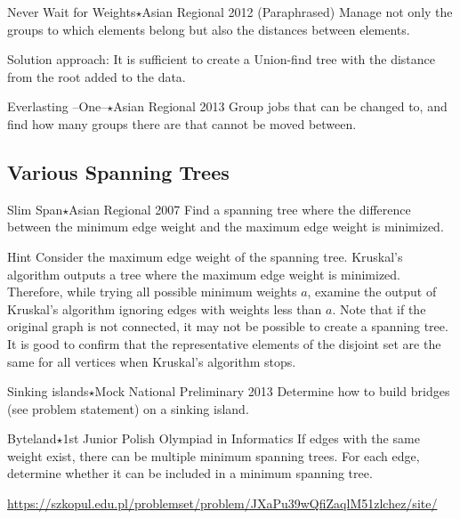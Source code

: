 \begin{pbox}{Never Wait for Weights$\star$}{Asian Regional 2012}
(Paraphrased) Manage not only the groups to which elements belong but also the distances between elements.

\end{pbox}

Solution approach: It is sufficient to create a Union-find tree with the distance from the root added to the data.

\begin{pbox}{Everlasting --One--$\star$}{Asian Regional 2013}
Group jobs that can be changed to, and find how many groups there are that cannot be moved between.

\end{pbox}
\subsection{Various Spanning Trees}

\begin{pbox}{Slim Span$\star$}{Asian Regional 2007}
  Find a spanning tree where the difference between the minimum edge weight and the maximum edge weight is minimized.

\end{pbox}
\begin{tipsbox}{Hint}
  Consider the maximum edge weight of the spanning tree. Kruskal's algorithm outputs a tree where the maximum edge weight is minimized. Therefore, while trying all possible minimum weights $a$, examine the output of Kruskal's algorithm ignoring edges with weights less than $a$. Note that if the original graph is not connected, it may not be possible to create a spanning tree. It is good to confirm that the representative elements of the disjoint set are the same for all vertices when Kruskal's algorithm stops.
\end{tipsbox}

\begin{pbox}{Sinking islands$\star$}{Mock National Preliminary 2013}
Determine how to build bridges (see problem statement) on a sinking island.
  
\end{pbox}


\begin{pbox}{Byteland$\star$}{1st Junior Polish Olympiad in Informatics}
If edges with the same weight exist, there can be multiple minimum spanning trees.
For each edge, determine whether it can be included in a minimum spanning tree.

\url{https://szkopul.edu.pl/problemset/problem/JXaPu39wQfiZaqlM51zlchez/site/}
\end{pbox}


